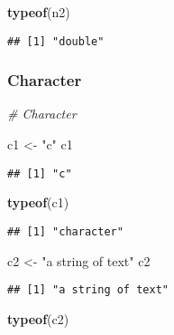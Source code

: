 \documentclass[
]{article}
\newenvironment{Shaded}{\begin{snugshade}}{\end{snugshade}}
\newcommand{\CommentTok}[1]{\textcolor[rgb]{0.56,0.35,0.01}{\textit{#1}}}
\newcommand{\FunctionTok}[1]{\textcolor[rgb]{0.13,0.29,0.53}{\textbf{#1}}}
\newcommand{\NormalTok}[1]{#1}
\newcommand{\OtherTok}[1]{\textcolor[rgb]{0.56,0.35,0.01}{#1}}
\newcommand{\StringTok}[1]{\textcolor[rgb]{0.31,0.60,0.02}{#1}}
\begin{document}
\begin{Shaded}
\begin{Highlighting}[]
\FunctionTok{typeof}\NormalTok{(n2)}
\end{Highlighting}
\end{Shaded}

\begin{verbatim}
## [1] "double"
\end{verbatim}

\subsubsection{Character}\label{character}

\begin{Shaded}
\begin{Highlighting}[]
\CommentTok{\# Character}

\NormalTok{c1 }\OtherTok{\textless{}{-}} \StringTok{"c"}
\NormalTok{c1}
\end{Highlighting}
\end{Shaded}

\begin{verbatim}
## [1] "c"
\end{verbatim}

\begin{Shaded}
\begin{Highlighting}[]
\FunctionTok{typeof}\NormalTok{(c1)}
\end{Highlighting}
\end{Shaded}

\begin{verbatim}
## [1] "character"
\end{verbatim}

\begin{Shaded}
\begin{Highlighting}[]
\NormalTok{c2 }\OtherTok{\textless{}{-}} \StringTok{"a string of text"}
\NormalTok{c2}
\end{Highlighting}
\end{Shaded}

\begin{verbatim}
## [1] "a string of text"
\end{verbatim}

\begin{Shaded}
\begin{Highlighting}[]
\FunctionTok{typeof}\NormalTok{(c2)}
\end{Highlighting}
\end{Shaded}
\end{document}
